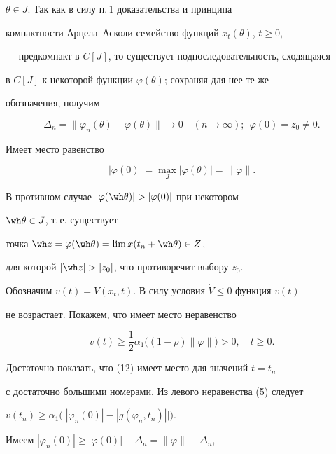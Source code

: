 \begin{pf}
$\theta\in J$. Так как в силу п.\,1 доказательства и принципа


компактности Арцела--Асколи семейство функций $x_t(\theta)$, $t\geqslant0$,


--- предкомпакт в $C[J]$, то существует подпоследовательность, сходящаяся


в $C[J]$ к некоторой функции $\varphi(\theta)$; сохраняя для нее те же


обозначения, получим


\begin{equation}


\Delta_n=\|\varphi_n(\theta)-\varphi(\theta)\|\to0\quad


(n\to\infty);\ \ \varphi(0)=z_0\ne0.


\end{equation}


Имеет место равенство


$$


|\varphi(0)|=\max_J |\varphi(\theta)|=\|\varphi\|.


$$


В противном случае $|\varphi(\wh\theta)|>|\varphi(0)|$ при некотором


$\wh\theta\in J$, т.\,е. существует


точка $\wh z=\varphi(\wh\theta)=\lim x(t_n+\wh\theta)\in Z$,


для которой $|\wh z|>|z_0|$, что противоречит выбору $z_0$.





Обозначим $v(t)=V(x_t,t)$. В силу условия $\Dot V\leqslant0$ функция $v(t)$


не возрастает. Покажем, что имеет место неравенство


\begin{equation}


v(t)\geqslant\frac{1}{2}\alpha_1\big((1-\rho)\|\varphi\|\big)>0,\quad


t\geqslant0.


\end{equation}


Достаточно показать, что (12) имеет место для значений $t=t_n$


с достаточно большими номерами. Из левого неравенства (5) следует


$v(t_n)\geqslant\alpha_1\big(\big||\varphi_n(0)|


-|g(\varphi_n,t_n)|\big|\big)$.


Имеем $|\varphi_n(0)|\geqslant|\varphi(0)|-\Delta_n=\|\varphi\|-\Delta_n$,



\end{pf}
